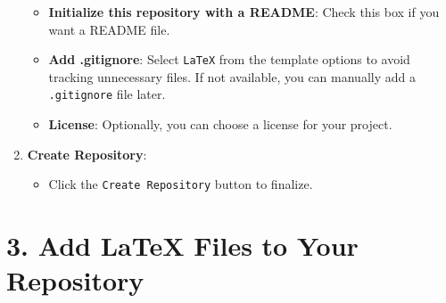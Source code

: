 \documentclass[12pt, a4paper]{article}
\begin{document}
\begin{enumerate}
\begin{itemize}
        \item \textbf{Initialize this repository with a README}: \textmd{Check this box if you want a README file.}
        
        \item \textbf{Add .gitignore}: \textmd{Select \texttt{LaTeX} from the template options to avoid tracking unnecessary files. If not available, you can manually add a \texttt{.gitignore} file later.}
        
        \item \textbf{License}: \textmd{Optionally, you can choose a license for your project.}
    \end{itemize}
\vspace{0.3cm}
    \item \textbf{Create Repository}:
    \begin{itemize}
        \item \textmd{Click the \texttt{Create Repository} button to finalize.}
    \end{itemize}
\end{enumerate}
\newpage
{}
\vspace{-2cm}
\section*{\textcolor{blue!60}{3. Add LaTeX Files to Your Repository}}
\end{document}
